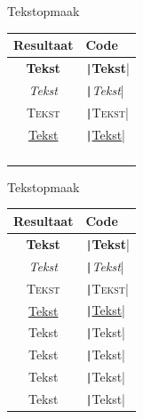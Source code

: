
\begin{frame}{Tekstopmaak}
	\begin{table}
		\centering
		\begin{tabular}{c | p{4.1cm}}
			Resultaat & Code \\
			\hline
			\textbf{Tekst} & \texttt|\textbf{Tekst}| \\
			\textit{Tekst} & \texttt|\textit{Tekst}| \\
			\textsc{Tekst} & \texttt|\textsc{Tekst}| \\
			\underline{Tekst} & \texttt|\underline{Tekst}| \\
			\hline
			& \\
			& \\
			& \\
			& \\
		\end{tabular}
	\end{table}
\end{frame}

\begin{frame}{Tekstopmaak}
	\begin{table}
		\centering
		\begin{tabular}{c | p{4.1cm}}
			Resultaat & Code \\
			\hline
			\textbf{Tekst} & \texttt|\textbf{Tekst}| \\
			\textit{Tekst} & \texttt|\textit{Tekst}| \\
			\textsc{Tekst} & \texttt|\textsc{Tekst}| \\
			\underline{Tekst} & \texttt|\underline{Tekst}| \\
			\hline
			{\tiny Tekst} & \texttt|{\tiny Tekst}| \\
			{\small Tekst} & \texttt|{\small Tekst}| \\
			{\large Tekst} & \texttt|{\large Tekst}| \\
			{\huge Tekst} & \texttt|{\huge Tekst}| \\
		\end{tabular}
	\end{table}
\end{frame}